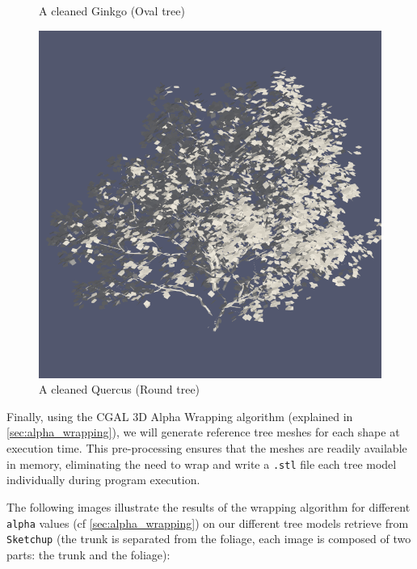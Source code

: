 \documentclass[12pt]{article}
\begin{document}
\begin{figure}[H]
\begin{minipage}{0.30\textwidth}
        \caption{A cleaned Ginkgo (Oval tree)}
    \end{minipage}
    \begin{minipage}{0.30\textwidth}
        \centering
        \includegraphics[width=1\textwidth]{images/tree-quercus.png}
        \caption{A cleaned Quercus (Round tree)}
    \end{minipage}
\end{figure}

Finally, using the CGAL 3D Alpha Wrapping algorithm (explained in \autoref{sec:alpha_wrapping}), 
we will generate reference tree
meshes for each shape at execution time. This pre-processing ensures
that the meshes are readily available in memory, eliminating the need to wrap and
write a \texttt{.stl} file each tree model individually during program execution.


The following images illustrate the results of the wrapping algorithm for different
\texttt{alpha} values (cf \autoref{sec:alpha_wrapping}) on our different tree models
 retrieve from \texttt{Sketchup}
(the trunk is separated from the foliage, each image is composed of two parts: 
the trunk and the foliage):
\end{document}
